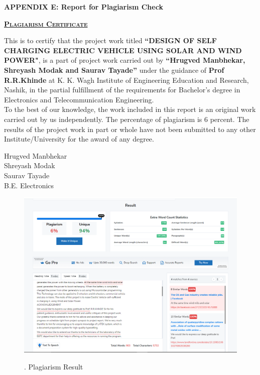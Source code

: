 \documentclass[a4paper,12pt]{article}
\begin{document}
\newpage
\begin{center}
\LARGE\textbf{APPENDIX E: Report for Plagiarism Check}
\end{center}
\thispagestyle{empty}
\begin{center}
\textbf{\LARGE\scshape\underline{Plagiarism Certificate}}\\[2cm]
\end{center}
\large This is to certify that the project work titled \textbf{“DESIGN OF SELF CHARGING ELECTRIC VEHICLE USING SOLAR AND WIND POWER"}, is a part of project work carried out by \textbf{“Hrugved Manbhekar, Shreyash Modak and Saurav Tayade”}
under the guidance of\textbf{ Prof R.R.Khinde} at K. K. Wagh Institute of
Engineering Education and Research, Nashik, in the partial fulfillment of the requirements
for Bachelor’s degree in Electronics and Telecommunication Engineering.\\
\large To the best of our knowledge, the work included in this report is an original work
carried out by us independently. The percentage of plagiarism is 6 percent. The results of the
project work in part or whole have not been submitted to any other Institute/University for
the award of any degree.

\vspace{4cm}
\begin{flushright}
Hrugved Manbhekar\\
Shreyash Modak\\
Saurav Tayade\\

B.E. Electronics\\
\end{flushright}

\newpage
\begin{figure}[!h]
\centering
\includegraphics[scale=0.5]{pl.png}\\
\caption{. Plagiarism Result}
\end{figure}
\end{document}
